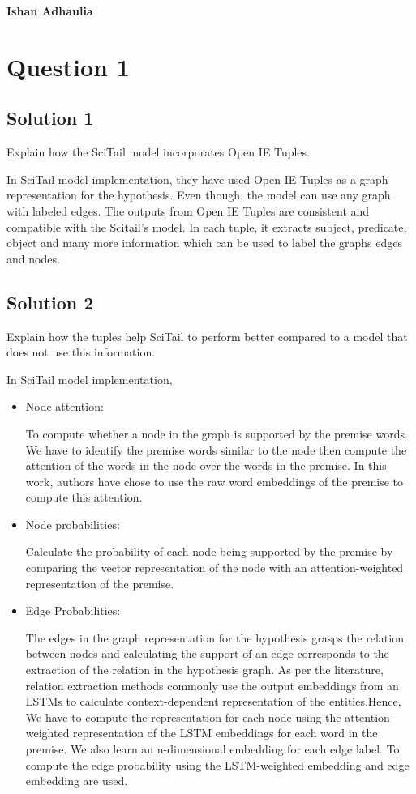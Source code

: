 \documentclass[12pt,leqno,a4paper]{article}
\begin{document}
\textbf{Ishan Adhaulia}

\section{Question 1}

\subsection{Solution 1}
Explain how the SciTail model incorporates Open IE Tuples.
\newline

In SciTail model implementation, they have used Open IE Tuples as a graph representation for the hypothesis. Even though, the model can use any graph with labeled edges. The outputs from Open IE Tuples are consistent and compatible with the Scitail's model. In each tuple, it extracts subject, predicate, object and many more information which can be used to label the graphs edges and nodes.

\subsection{Solution 2}
Explain how the tuples help SciTail to perform better compared to a model
that does not use this information. 
\newline

In SciTail model implementation,
\begin{itemize}
    \item Node attention: 
    
    To compute whether a node in the graph is supported by the premise words. We have to identify the premise words similar to the node then compute the attention of the words in the node over the words in the premise. In this work, authors have chose to use the raw word embeddings of the premise to compute this attention.
    
    \item Node probabilities:
    
    Calculate the probability of each node being supported by the premise by comparing the vector representation of the node with an attention-weighted representation of the premise. 
    
    \item Edge Probabilities:
    
    The edges in the graph representation for the hypothesis grasps the relation between nodes and calculating the support of an edge corresponds to the extraction of the relation in the hypothesis graph.
    As per the literature, relation extraction methods  commonly use the output embeddings from an LSTMs to calculate context-dependent representation of the entities.Hence, We have to compute the representation for each node using the attention-weighted representation of the LSTM embeddings for each word in the premise.
    We also learn an n-dimensional embedding for each edge label. To compute
    the edge probability using the LSTM-weighted embedding and edge embedding are used.
\end{itemize}
\end{document}
